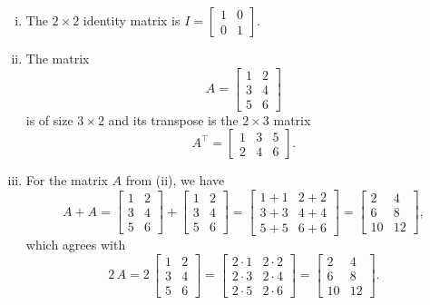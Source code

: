\begin{example}
\begin{enumerate}[(i)]
	\item The $2 \times 2$ identity matrix is $I = \begin{bmatrix} 1 & 0 \\ 0 & 1 \end{bmatrix}.$
	\item The matrix
	\[ A = \begin{bmatrix}
	1 & 2 \\ 3 & 4 \\ 5 & 6
	\end{bmatrix}\]
	is of size $3 \times 2$ and its transpose is the $2 \times 3$ matrix
	\[ A^{\top} = \begin{bmatrix}
	1 & 3 & 5 \\ 2 & 4 & 6
	\end{bmatrix}.\]
	\item For the matrix $A$ from (ii), we have
	\[ A + A = \begin{bmatrix}
	1 & 2 \\ 3 & 4 \\ 5 & 6
	\end{bmatrix} + \begin{bmatrix}
	1 & 2 \\ 3 & 4 \\ 5 & 6
	\end{bmatrix} = \begin{bmatrix}
	1+1 & 2+2 \\ 3+3 & 4+4 \\ 5+5 & 6+6
	\end{bmatrix} = \begin{bmatrix}
	2 & 4 \\ 6 & 8 \\ 10 & 12
	\end{bmatrix},\]
	which agrees with
	\[ 2 \, A = 2 \, \begin{bmatrix}
	1 & 2 \\ 3 & 4 \\ 5 & 6
	\end{bmatrix} = \begin{bmatrix}
	2\cdot1 & 2\cdot2 \\ 2\cdot3 & 2\cdot4 \\ 2\cdot5 & 2\cdot6
	\end{bmatrix} = \begin{bmatrix}
	2 & 4 \\ 6 & 8 \\ 10 & 12
	\end{bmatrix}.\]

\end{enumerate}
\end{example}
